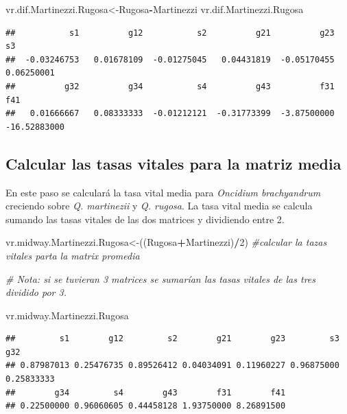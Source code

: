\documentclass[
]{book}
\newenvironment{Shaded}{\begin{snugshade}}{\end{snugshade}}
\newcommand{\CommentTok}[1]{\textcolor[rgb]{0.56,0.35,0.01}{\textit{#1}}}
\newcommand{\DecValTok}[1]{\textcolor[rgb]{0.00,0.00,0.81}{#1}}
\newcommand{\NormalTok}[1]{#1}
\newcommand{\OtherTok}[1]{\textcolor[rgb]{0.56,0.35,0.01}{#1}}
\newcommand{\SpecialCharTok}[1]{\textcolor[rgb]{0.81,0.36,0.00}{\textbf{#1}}}
\theoremstyle{definition}
\theoremstyle{definition}
\theoremstyle{definition}
\theoremstyle{definition}
\theoremstyle{remark}
\begin{document}
\begin{Shaded}
\begin{Highlighting}[]
\NormalTok{vr.dif.Martinezzi.Rugosa}\OtherTok{\textless{}{-}}\NormalTok{Rugosa}\SpecialCharTok{{-}}\NormalTok{Martinezzi }
\NormalTok{vr.dif.Martinezzi.Rugosa}
\end{Highlighting}
\end{Shaded}

\begin{verbatim}
##           s1          g12           s2          g21          g23           s3 
##  -0.03246753   0.01678109  -0.01275045   0.04431819  -0.05170455   0.06250001 
##          g32          g34           s4          g43          f31          f41 
##   0.01666667   0.08333333  -0.01212121  -0.31773399  -3.87500000 -16.52883000
\end{verbatim}

\subsection{Calcular las tasas vitales para la matriz media}\label{calcular-las-tasas-vitales-para-la-matriz-media}

En este paso se calculará la tasa vital media para \emph{Oncidium brachyandrum} creciendo sobre \emph{Q. martinezii} y \emph{Q. rugosa}. La tasa vital media se calcula sumando las tasas vitales de las dos matrices y dividiendo entre 2.

\begin{Shaded}
\begin{Highlighting}[]
\NormalTok{vr.midway.Martinezzi.Rugosa}\OtherTok{\textless{}{-}}\NormalTok{((Rugosa}\SpecialCharTok{+}\NormalTok{Martinezzi)}\SpecialCharTok{/}\DecValTok{2}\NormalTok{) }\CommentTok{\#calcular la tazas vitales parta la matrix promedia}

\CommentTok{\# Nota: si se tuvieran 3 matrices se sumarían las tasas vitales de las tres dividido por 3. }

\NormalTok{vr.midway.Martinezzi.Rugosa}
\end{Highlighting}
\end{Shaded}

\begin{verbatim}
##         s1        g12         s2        g21        g23         s3        g32 
## 0.87987013 0.25476735 0.89526412 0.04034091 0.11960227 0.96875000 0.25833333 
##        g34         s4        g43        f31        f41 
## 0.22500000 0.96060605 0.44458128 1.93750000 8.26891500
\end{verbatim}
\end{document}
